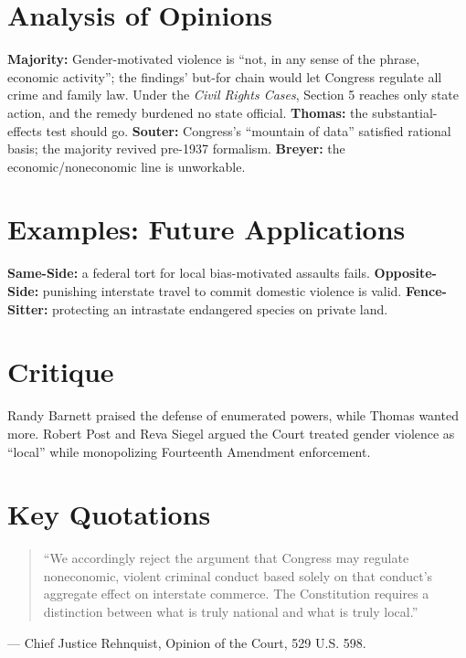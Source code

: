 \documentclass[12pt]{article}
\begin{document}
\section{Analysis of Opinions}
\textbf{Majority:} Gender-motivated violence is ``not, in any sense of the phrase, economic activity''; the findings' but-for chain would let Congress regulate all crime and family law. Under the \textit{Civil Rights Cases}, Section 5 reaches only state action, and the remedy burdened no state official. \textbf{Thomas:} the substantial-effects test should go. \textbf{Souter:} Congress's ``mountain of data'' satisfied rational basis; the majority revived pre-1937 formalism. \textbf{Breyer:} the economic/noneconomic line is unworkable.

\section{Examples: Future Applications}
\textbf{Same-Side:} a federal tort for local bias-motivated assaults fails. \textbf{Opposite-Side:} punishing interstate travel to commit domestic violence is valid. \textbf{Fence-Sitter:} protecting an intrastate endangered species on private land.

\section{Critique}
Randy Barnett praised the defense of enumerated powers, while Thomas wanted more. Robert Post and Reva Siegel argued the Court treated gender violence as ``local'' while monopolizing Fourteenth Amendment enforcement.

\section{Key Quotations}
\begin{quote}
``We accordingly reject the argument that Congress may regulate noneconomic, violent criminal conduct based solely on that conduct's aggregate effect on interstate commerce. The Constitution requires a distinction between what is truly national and what is truly local.''
\end{quote}
\noindent --- Chief Justice Rehnquist, Opinion of the Court, 529 U.S. 598.
\end{document}
